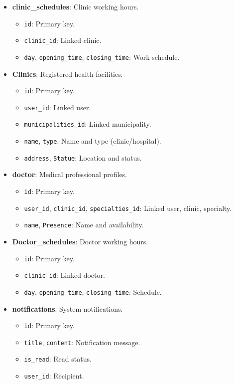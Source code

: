 \documentclass[12pt]{report}
\begin{document}
\begin{itemize}
	\item \textbf{clinic\_schedules}: Clinic working hours.
	      \begin{itemize}
		      \item \texttt{id}: Primary key.
		      \item \texttt{clinic\_id}: Linked clinic.
		      \item \texttt{day}, \texttt{opening\_time}, \texttt{closing\_time}: Work schedule.
	      \end{itemize}

	\item \textbf{Clinics}: Registered health facilities.
	      \begin{itemize}
		      \item \texttt{id}: Primary key.
		      \item \texttt{user\_id}: Linked user.
		      \item \texttt{municipalities\_id}: Linked municipality.
		      \item \texttt{name}, \texttt{type}: Name and type (clinic/hospital).
		      \item \texttt{address}, \texttt{Statue}: Location and status.
	      \end{itemize}

	\item \textbf{doctor}: Medical professional profiles.
	      \begin{itemize}
		      \item \texttt{id}: Primary key.
		      \item \texttt{user\_id}, \texttt{clinic\_id}, \texttt{specialties\_id}: Linked user, clinic, specialty.
		      \item \texttt{name}, \texttt{Presence}: Name and availability.
	      \end{itemize}

	\item \textbf{Doctor\_schedules}: Doctor working hours.
	      \begin{itemize}
		      \item \texttt{id}: Primary key.
		      \item \texttt{clinic\_id}: Linked doctor.
		      \item \texttt{day}, \texttt{opening\_time}, \texttt{closing\_time}: Schedule.
	      \end{itemize}

	\item \textbf{notifications}: System notifications.
	      \begin{itemize}
		      \item \texttt{id}: Primary key.
		      \item \texttt{title}, \texttt{content}: Notification message.
		      \item \texttt{is\_read}: Read status.
		      \item \texttt{user\_id}: Recipient.
	      \end{itemize}


\end{itemize}
\end{document}

